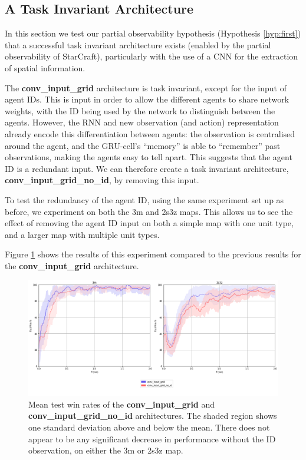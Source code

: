 \subsection{A Task Invariant Architecture}
In this section we test our partial observability hypothesis (Hypothesis \ref{hyp:first}) that a successful task invariant architecture exists (enabled by the partial observability of StarCraft), particularly with the use of a CNN for the extraction of spatial information.

The \textbf{conv\_input\_grid} architecture is task invariant, except for the input of agent IDs. This is input in order to allow the different agents to share network weights, with the ID being used by the network to distinguish between the agents. However, the RNN and new observation (and action) representation already encode this differentiation between agents: the observation is centralised around the agent, and the GRU-cell's ``memory'' is able to ``remember'' past observations, making the agents easy to tell apart. This suggests that the agent ID is a redundant input. We can therefore create a task invariant architecture, \textbf{conv\_input\_grid\_no\_id}, by removing this input.


To test the redundancy of the agent ID, using the same experiment set up as before, we experiment on both the 3m and 2s3z maps. This allows us to see the effect of removing the agent ID input on both a simple map with one unit type, and a larger map with multiple unit types.

Figure \ref{fig:noid} shows the results of this experiment compared to the previous results for the \textbf{conv\_input\_grid} architecture.

\begin{figure}
    \centering
    \hbox{\hspace{-6.6em}\includegraphics[scale=0.47]{images/graphs/noid.png}}
    \caption{Mean test win rates of the \textbf{conv\_input\_grid} and \textbf{conv\_input\_grid\_no\_id} architectures. The shaded region shows one standard deviation above and below the mean. There does not appear to be any significant decrease in performance without the ID observation, on either the 3m or 2s3z map.}
    \label{fig:noid}
\end{figure}


